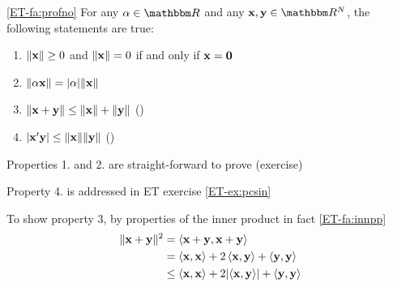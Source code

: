     


\begin{frame}
    
    \vspace{2em}
    \Fact\eqref{ET-fa:profno} For any $\alpha \in \RR$ and any $\boldx, \boldy \in \RR^N$,
    the following 
    statements are true:
    \begin{enumerate}
        \item $\| {\mathbf x} \| \geq 0$ and $\| {\mathbf x} \| = 0$ if and only if
            ${\mathbf x} = {\mathbf 0}$
            \vspace{1em}
        \item $\| \alpha {\mathbf x} \| = |\alpha| \| {\mathbf x} \|$
            \vspace{1em}
        \item $\| {\mathbf x} + {\mathbf y} \| \leq  \| {\mathbf x} \| + \| {\mathbf y} \|$
            ()
            \vspace{1em}
        \item $| {\mathbf x}' {\mathbf y} | \leq  \| {\mathbf x} \| \| {\mathbf y} \|$
            ()
    \end{enumerate}

\end{frame}

\begin{frame}

    \vspace{2em}
    Properties 1. and 2. are straight-forward to prove (exercise)
    
    Property 4. is addressed in ET exercise \ref{ET-ex:pcsin}
    
    To show property 3, by properties of the inner product in fact \ref{ET-fa:innpp}
    \begin{align*}
        \label{eq:tifcs}
         \| {\mathbf x} + {\mathbf y} \|^2
        & = \left\langle{ {\mathbf x} +  {\mathbf y} ,  {\mathbf x} +  {\mathbf y} }\right\rangle
        \\& = \left\langle{ {\mathbf x} ,  {\mathbf x} }\right\rangle + 2 \left\langle{ {\mathbf x} ,  {\mathbf y} }\right\rangle +  \left\langle{ {\mathbf y} ,
         {\mathbf y} }\right\rangle
        \\& \leq \left\langle{ {\mathbf x} ,  {\mathbf x} }\right\rangle + 2 | \! \left\langle{ {\mathbf x} ,  {\mathbf y} }\right\rangle \! | +  \left\langle{ {\mathbf y} ,
         {\mathbf y} }\right\rangle
    \end{align*}
\end{frame}

